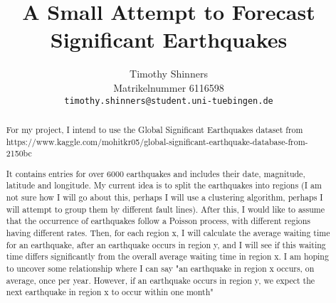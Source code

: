 \documentclass{article}
\title{A Small Attempt to Forecast Significant Earthquakes}
\author{%
  Timothy Shinners\\
  Matrikelnummer 6116598\\
  \texttt{timothy.shinners@student.uni-tuebingen.de} \\
}
\begin{document}
\maketitle

\begin{abstract}
  For my project, I intend to use the Global Significant Earthquakes dataset from https://www.kaggle.com/mohitkr05/global-significant-earthquake-database-from-2150bc 
  
  It contains entries for over 6000 earthquakes and includes their date, magnitude, latitude and longitude. My current idea is to split the earthquakes into regions (I am not sure how I will go about this, perhaps I will use a clustering algorithm, perhaps I will attempt to group them by different fault lines). After this, I would like to assume that the occurrence of earthquakes follow a Poisson process, with different regions having different rates. Then, for each region x, I will calculate the average waiting time for an earthquake, after an earthquake occurs in region y, and I will see if this waiting time differs significantly from the overall average waiting time in region x. I am hoping to uncover some relationship where I can say "an earthquake in region x occurs, on average, once per year. However, if an earthquake occurs in region y, we expect the next earthquake in region x to occur within one month"
\end{abstract}
\end{document}
